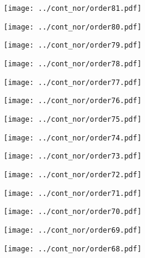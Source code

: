 \documentclass{article}
\begin{document}
\begin{figure}[H]
    \centering
    \texttt{[image: ../cont\_nor/order81.pdf]}
\end{figure}
\begin{figure}[H]
    \centering
    \texttt{[image: ../cont\_nor/order80.pdf]}
\end{figure}
\begin{figure}[H]
    \centering
    \texttt{[image: ../cont\_nor/order79.pdf]}
\end{figure}
\begin{figure}[H]
    \centering
    \texttt{[image: ../cont\_nor/order78.pdf]}
\end{figure}
\begin{figure}[H]
    \centering
    \texttt{[image: ../cont\_nor/order77.pdf]}
\end{figure}
\begin{figure}[H]
    \centering
    \texttt{[image: ../cont\_nor/order76.pdf]}
\end{figure}
\begin{figure}[H]
    \centering
    \texttt{[image: ../cont\_nor/order75.pdf]}
\end{figure}
\begin{figure}[H]
    \centering
    \texttt{[image: ../cont\_nor/order74.pdf]}
\end{figure}
\begin{figure}[H]
    \centering
    \texttt{[image: ../cont\_nor/order73.pdf]}
\end{figure}
\begin{figure}[H]
    \centering
    \texttt{[image: ../cont\_nor/order72.pdf]}
\end{figure}
\begin{figure}[H]
    \centering
    \texttt{[image: ../cont\_nor/order71.pdf]}
\end{figure}
\begin{figure}[H]
    \centering
    \texttt{[image: ../cont\_nor/order70.pdf]}
\end{figure}
\begin{figure}[H]
    \centering
    \texttt{[image: ../cont\_nor/order69.pdf]}
\end{figure}
\begin{figure}[H]
    \centering
    \texttt{[image: ../cont\_nor/order68.pdf]}
\end{figure}
\end{document}
